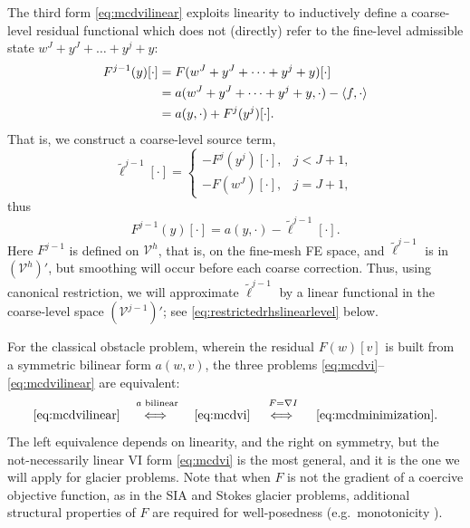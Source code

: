 \documentclass[letterpaper,final,12pt,reqno]{amsart}
\theoremstyle{claim}
\newcommand{\grad}{\nabla}
\newcommand{\ip}[2]{\left<#1,#2\right>}
\numberwithin{equation}{section}
\numberwithin{figure}{section}
\numberwithin{table}{section}
\numberwithin{theorem}{section}
\begin{document}
The third form \eqref{eq:mcdvilinear} exploits linearity to inductively define a coarse-level residual functional which does not (directly) refer to the fine-level admissible state $w^J+y^J+\dots+y^j+y$:
\begin{align}
  F^{j-1}(y)[\cdot] &= F(w^J+y^J+\dots+y^j+y)[\cdot] \label{eq:residuallinearlevelderive} \\
                    &= a(w^J+y^J+\dots+y^j+y,\cdot) - \ip{f}{\cdot} \notag \\
                    &= a(y,\cdot) + F^j(y^j)[\cdot]. \notag
\end{align}
That is, we construct a coarse-level source term,
\begin{equation}
  \tilde\ell^{j-1}[\cdot] = \begin{cases} - F^j(y^j)[\cdot], & j < J+1, \\
                                    - F(w^J)[\cdot],   & j = J+1, \end{cases} \label{eq:rhslinearlevel}
\end{equation}
thus
\begin{equation}
F^{j-1}(y)[\cdot] = a(y,\cdot) - \tilde\ell^{j-1}[\cdot].  \label{eq:residuallinearlevel}
\end{equation}
Here $F^{j-1}$ is defined on $\mathcal{V}^h$, that is, on the fine-mesh FE space, and $\tilde\ell^{j-1}$ is in $(\mathcal{V}^h)'$, but smoothing will occur before each coarse correction.  Thus, using canonical restriction, we will approximate $\tilde\ell^{j-1}$ by a linear functional in the coarse-level space $(\mathcal{V}^{j-1})'$; see \eqref{eq:restrictedrhslinearlevel} below.

For the classical obstacle problem, wherein the residual $F(w)[v]$ is built from a symmetric bilinear form $a(w,v)$, the three problems \eqref{eq:mcdvi}--\eqref{eq:mcdvilinear} are equivalent:
   $$\eqref{eq:mcdvilinear} \quad \stackrel{a \text{ bilinear}}{\iff\strut} \quad \eqref{eq:mcdvi} \quad \stackrel{F=\grad I}{\iff\strut} \quad \eqref{eq:mcdminimization}.$$
The left equivalence depends on linearity, and the right on symmetry, but the not-necessarily linear VI form \eqref{eq:mcdvi} is the most general, and it is the one we will apply for glacier problems.  Note that when $F$ is not the gradient of a coercive objective function, as in the SIA and Stokes glacier problems, additional structural properties of $F$ are required for well-posedness (e.g.~monotonicity \cite{Bueler2020,JouvetBueler2012,KinderlehrerStampacchia1980}).
\end{document}
